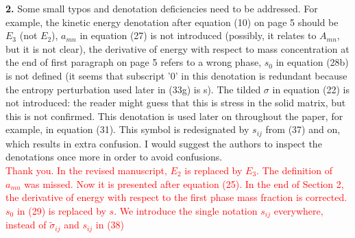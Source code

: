\documentclass[3p,times,table]{article}
\newcommand{\revOne}[1]{\textcolor{Red}{#1}}
\begin{document}
\textbf{2.}      Some small typos and denotation deficiencies need to be addressed. For example, 
the kinetic 
energy denotation after equation (10) on page 5 should be $ E_3 $ (not $ E_2 $), $ a_{mn} $ in 
equation 
(27) is 
not introduced (possibly, it relates to $ A_{mn} $, but it is not clear), the derivative of energy 
with 
respect to mass concentration at the end of first paragraph on page 5 refers to a wrong phase, $ 
s_0 $ 
in equation (28b) is not defined (it seems that subscript '0' in this denotation is redundant 
because the entropy perturbation used later in (33g) is s). The tilded $ \sigma $ in equation (22) 
is 
not introduced: the reader might guess that this is stress in the solid matrix, but this is not 
confirmed. This denotation is used later on throughout the paper, for example, in equation (31). 
This symbol is redesignated by $ s_{ij} $ from (37) and on, which results in extra confusion. I 
would 
suggest the authors to inspect the denotations once more in order to 
avoid confusions.
\\
\revOne{Thank you. In the revised manuscript, $ E_2 $ is replaced by 
$ E_3 $.
	The definition of  $ a_{mn} $ was missed. Now it is presented 
	after equation (25).
	In the end of Section 2, the derivative of energy with respect 
	to 
	the first phase mass fraction is corrected.
	$ s_0 $ in (29) is replaced by $ s $.
	We introduce the single notation $ s_{ij} $ everywhere, instead 
	of 
	$ \tilde{\sigma}_{ij}$  and $ s_{ij} $ in (38)
}
\\
\end{document}
